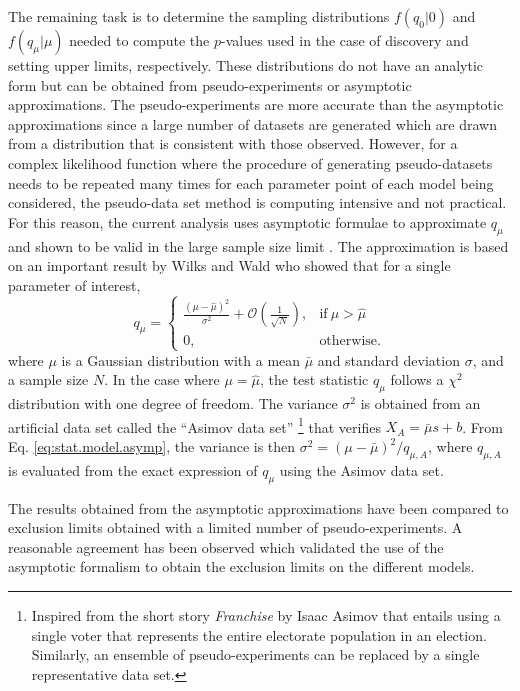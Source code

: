 The remaining task is to determine the sampling distributions
$f\left(q_{0} \rvert 0\right)$ and $f\left(q_{\mu} \rvert \mu\right)$
needed to compute the $p$-values
used in the case of discovery and setting upper limits, respectively.
These distributions do not have an analytic form but can be obtained from 
pseudo-experiments or asymptotic approximations.
The pseudo-experiments are more accurate than the asymptotic 
approximations since a large number of 
datasets are generated which are drawn from a distribution that is consistent 
with those observed.
However, for a complex likelihood function where the procedure of generating 
pseudo-datasets needs to be repeated many times for each parameter point
of each model being considered, the pseudo-data set method is computing 
intensive and not practical. For this reason, the current analysis 
uses asymptotic formulae to approximate $q_{\mu}$ and shown to be valid in the 
large sample size limit \cite{Cowan:2010js}. The approximation is based on an important result 
by Wilks \cite{Wilks:1938dza} and Wald \cite{Wald:ams1943} who showed that for a single parameter of interest,
\begin{equation}
  q_{\mu} =
  \begin{cases}
    \frac{\left(\mu - \hat{\mu}\right)^2}{\sigma^2} + \mathcal{O}\left(\frac{1}{\sqrt{N}}\right)
    , & \text{if}\ \mu > \hat{\mu} \\
    0, & \text{otherwise}.
  \end{cases}
\label{eq:stat.model.asymp}
\end{equation}
where $\mu$ is a Gaussian distribution with a mean $\bar{\mu}$ and 
standard deviation $\sigma$, and a sample size $N$. In the case where 
$\mu = \hat{\mu}$, the test statistic $q_{\mu}$ follows a $\chi^2$ distribution
with one degree of freedom. 
The variance $\sigma^2$ is obtained from an artificial data set called the 
``Asimov data set''
\footnote{Inspired from the short story \textit{Franchise}\cite{asimov} by Isaac Asimov that entails using a single voter that represents the entire electorate 
population in an election. Similarly, an ensemble of pseudo-experiments 
can be replaced by a single representative data set.}
 that verifies $X_A = \bar{\mu} s + b$. 
From Eq. \ref{eq:stat.model.asymp}, the variance is then 
$\sigma^2 = \left( \mu - \bar{\mu} \right)^2/q_{\mu,A}$, where $q_{\mu,A}$ 
is evaluated from the exact expression of $q_{\mu}$ using the Asimov data set.

The results obtained from the asymptotic approximations have been compared to 
exclusion limits obtained with a limited number of pseudo-experiments.
A reasonable agreement has been observed which validated the use of 
the asymptotic formalism to obtain the exclusion limits on the different models.
